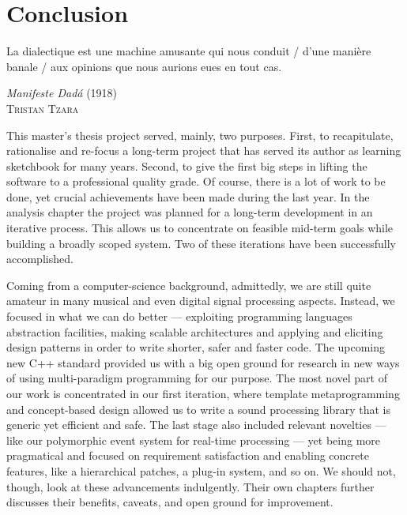 \chapter{Conclusion}
\label{sec:05-conclusion}

\epigraph{La dialectique est une machine amusante qui nous conduit /
  d'une manière banale / aux opinions que nous aurions eues en tout
  cas.}{\emph{Manifeste Dadá} (1918)\\\textsc{Tristan Tzara}}

This master's thesis project served, mainly, two purposes. First, to
recapitulate, rationalise and re-focus a long-term project that has
served its author as learning sketchbook for many years. Second, to
give the first big steps in lifting the software to a professional
quality grade. Of course, there is a lot of work to be done, yet
crucial achievements have been made during the last year. In
the analysis chapter the project was planned for a long-term
development in an iterative process. This allows us to concentrate on
feasible mid-term goals while building a broadly scoped system. Two of
these iterations have been successfully accomplished.

Coming from a computer-science background, admittedly, we are still
quite amateur in many musical and even digital signal processing
aspects. Instead, we focused in what we can do better --- exploiting
programming languages abstraction facilities, making scalable
architectures and applying and eliciting design patterns in order to
write shorter, safer and faster code. The upcoming new C++ standard
provided us with a big open ground for research in new ways of using
multi-paradigm programming for our purpose. The most novel part of our
work is concentrated in our first iteration, where template
metaprogramming and concept-based design allowed us to write a sound
processing library that is generic yet efficient and safe. The last
stage also included relevant novelties --- like our polymorphic event
system for real-time processing --- yet being more pragmatical and
focused on requirement satisfaction and enabling concrete features,
like a hierarchical patches, a plug-in system, and so on. We should
not, though, look at these advancements indulgently. Their own
chapters further discusses their benefits, caveats, and open ground
for improvement.

